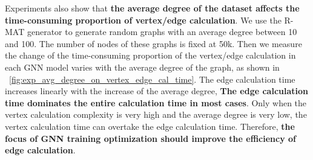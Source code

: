 Experiments also show that \textbf{the average degree of the dataset affects the time-consuming proportion of vertex/edge calculation}. 
We use the R-MAT generator to generate random graphs with an average degree between 10 and 100. The number of nodes of these graphs is fixed at 50k.
Then we measure the change of the time-consuming proportion of the vertex/edge calculation in each GNN model varies with the average degree of the graph,
as shown in \figurename~\ref{fig:exp_avg_degree_on_vertex_edge_cal_time}. The edge calculation time increases linearly with the increase of the average degree,
\textbf{The edge calculation time dominates the entire calculation time in most cases}. 
Only when the vertex calculation complexity is very high and the average degree is very low, the vertex calculation time can overtake the edge calculation time.
Therefore, \textbf{the focus of GNN training optimization should improve the efficiency of edge calculation}.

